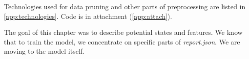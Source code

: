Technologies used for data pruning and other parts of preprocessing are listed in \ref{app:technologies}. Code is in attachment (\ref{app:attach}).

The goal of this chapter was to describe potential states and features. We know that to train the model, we concentrate on specific parts of \emph{report.json}. We are moving to the model itself.
















